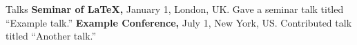 \begin{rubric}{Talks}
\entry*[2024]
    \textbf{Seminar of \LaTeX{},} January 1, London, UK. Gave a seminar talk titled ``Example talk.''
%
\entry*[2023]
    \textbf{Example Conference,} July 1, New York, US. Contributed talk titled ``Another talk.''
\end{rubric}